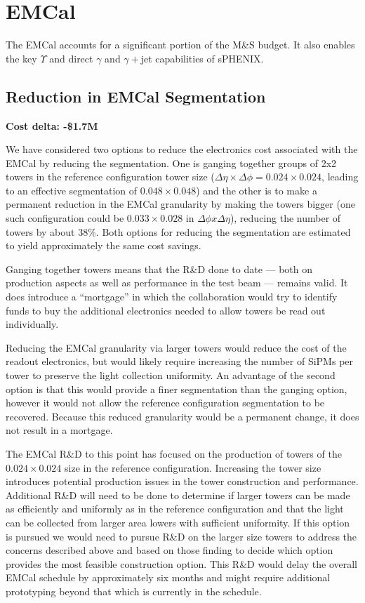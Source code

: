 \section{EMCal}

The EMCal accounts for a significant portion of the M\&S budget.  It
also enables the key $\Upsilon$ and direct $\gamma$ and $\gamma+$jet
capabilities of sPHENIX.  

\subsection{Reduction in EMCal Segmentation}
\label{emcal_ganging}
\label{emcal_segmentation}

\textbf{Cost delta: -\$1.7M}

We have considered two options to reduce the electronics cost
associated with the EMCal by reducing the segmentation.  One is
ganging together groups of 2x2 towers in the reference configuration
tower size ($\Delta\eta\times\Delta\phi = 0.024\times0.024$, leading
to an effective segmentation of $0.048 \times 0.048$) and the other is
to make a permanent reduction in the EMCal granularity by making the
towers bigger (one such configuration could be $0.033 \times 0.028$ in
$\Delta \phi x \Delta \eta$), reducing the number of towers by about
38\%. Both options for reducing the segmentation are estimated to
yield approximately the same cost savings.

Ganging together towers means that the R\&D done to date --- both on
production aspects as well as performance in the test beam --- remains
valid.  It does introduce a ``mortgage'' in which the collaboration
would try to identify funds to buy the additional electronics needed
to allow towers be read out individually.

Reducing the EMCal granularity via larger towers would reduce the cost
of the readout electronics, but would likely require increasing the
number of SiPMs per tower to preserve the light collection
uniformity. An advantage of the second option is that this would
provide a finer segmentation than the ganging option, however it would
not allow the reference configuration segmentation to be recovered.
Because this reduced granularity would be a permanent change, it does
not result in a mortgage.

The EMCal R\&D to this point has focused on the production of towers
of the $0.024\times 0.024$ size in the reference configuration.
Increasing the tower size introduces potential production issues in
the tower construction and performance. Additional R\&D will need to
be done to determine if larger towers can be made as efficiently and
uniformly as in the reference configuration and that the light can be
collected from larger area lowers with sufficient uniformity.  If this
option is pursued we would need to pursue R\&D on the larger size
towers to address the concerns described above and based on those
finding to decide which option provides the most feasible construction
option.  This R\&D would delay the overall EMCal schedule by
approximately six months and might require additional prototyping
beyond that which is currently in the schedule.

